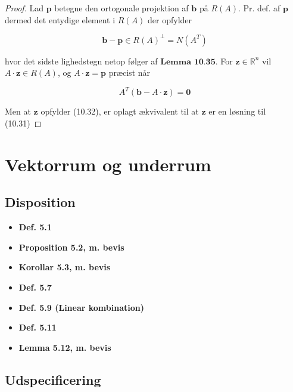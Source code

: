\documentclass[paper=a4, fontsize=11pt]{scrartcl} %
\begin{document}
	\begin{proof}
		
		Lad $\boldsymbol{p}$ betegne den ortogonale projektion af $\boldsymbol{b}$ på $R(A)$. Pr. def. af $\boldsymbol{p}$ dermed det entydige element i $R(A)$ der opfylder
		
		\[\textbf{b} - \textbf{p} \in R(A)^{\bot} = N(A^T) \tag{10.31}\]
		
		hvor det sidste lighedstegn netop følger af $\textbf{Lemma 10.35}$. For $\boldsymbol{z} \in \mathbb{R}^n$ vil $A \cdot \boldsymbol{z} \in R(A)$, og $A\cdot \boldsymbol{z} = \boldsymbol{p}$ præcist når 
		
		\[A^T(\textbf{b} - A \cdot \textbf{z}) = \textbf{0} \tag{10.32}\]
		
		Men at $\boldsymbol{z}$ opfylder (10.32), er oplagt ækvivalent til at $\boldsymbol{z}$ er en løsning til (10.31)
		
	\end{proof}
	
	\newpage
	
	\section{Vektorrum og underrum}
	
	\subsection{Disposition}
	
	\begin{itemize}
		\item \textbf{Def. 5.1}
		\item \textbf{Proposition 5.2, m. bevis}
		\item \textbf{Korollar 5.3, m. bevis}
		\item \textbf{Def. 5.7}
		\item \textbf{Def. 5.9 (Linear kombination)}
		\item \textbf{Def. 5.11}
		\item \textbf{Lemma 5.12, m. bevis}
	\end{itemize}
	
	\subsection{Udspecificering}
	
\end{document}
